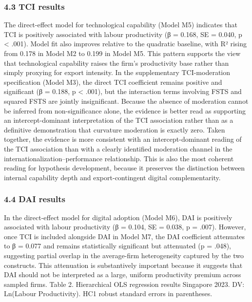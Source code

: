 \documentclass[
  12pt,a4paper]{article}
\begin{document}
\hypertarget{tci-results}{%
\subsubsection{4.3 TCI results}\label{tci-results}}

The direct-effect model for technological capability (Model M5)
indicates that TCI is positively associated with labour productivity (β
= 0.168, SE = 0.040, p \textless{} .001). Model fit also improves
relative to the quadratic baseline, with R² rising from 0.178 in Model
M2 to 0.199 in Model M5. This pattern supports the view that
technological capability raises the firm's productivity base rather than
simply proxying for export intensity. In the supplementary
TCI-moderation specification (Model M3), the direct TCI coefficient
remains positive and significant (β = 0.188, p \textless{} .001), but
the interaction terms involving FSTS and squared FSTS are jointly
insignificant. Because the absence of moderation cannot be inferred from
non-significance alone, the evidence is better read as supporting an
intercept-dominant interpretation of the TCI association rather than as
a definitive demonstration that curvature moderation is exactly zero.
Taken together, the evidence is more consistent with an
intercept-dominant reading of the TCI association than with a clearly
identified moderation channel in the internationalization--performance
relationship. This is also the most coherent reading for hypothesis
development, because it preserves the distinction between internal
capability depth and export-contingent digital complementarity.

\hypertarget{dai-results}{%
\subsubsection{4.4 DAI results}\label{dai-results}}

In the direct-effect model for digital adoption (Model M6), DAI is
positively associated with labour productivity (β = 0.104, SE = 0.038, p
= .007). However, once TCI is included alongside DAI in Model M7, the
DAI coefficient attenuates to β = 0.077 and remains statistically
significant but attenuated (p = .048), suggesting partial overlap in the
average-firm heterogeneity captured by the two constructs. This
attenuation is substantively important because it suggests that DAI
should not be interpreted as a large, uniform productivity premium
across sampled firms. Table 2. Hierarchical OLS regression results
Singapore 2023. DV: Ln(Labour Productivity). HC1 robust standard errors
in parentheses.
\end{document}
